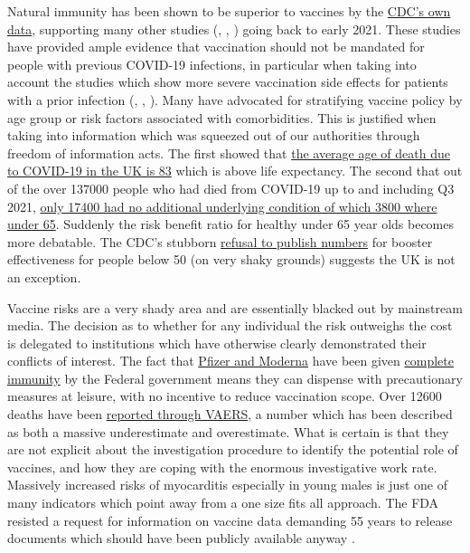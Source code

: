\documentclass[11pt,a4paper,notitlepage]{report}
\begin{document}
Natural immunity has been shown to be superior to vaccines by the \href{https://www.cdc.gov/mmwr/volumes/71/wr/mm7104e1.htm#F1_down}{CDC's own data}, supporting many other studies (\cite{Gazit2021.08.24.21262415}, \cite{doi:10.1126/science.abf4063}, \cite{Goldberg2021.04.20.21255670}) going back to early 2021. These studies have provided ample evidence that vaccination should not be mandated for people with previous COVID-19 infections, in particular when taking into account the studies which show more severe vaccination side effects for patients with a prior infection (\cite{Monforte2021}, \cite{LI20221082}, \cite{Raw22}). Many have advocated for stratifying vaccine policy by age group or risk factors associated with comorbidities. This is justified when taking into information which was squeezed out of our authorities through freedom of information acts. The first showed that \href{https://www.ons.gov.uk/aboutus/transparencyandgovernance/freedomofinformationfoi/averageageofthosewhohaddiedwithcovid19}{the average age of death due to COVID-19 in the UK is 83} which is above life expectancy. The second that out of the over 137000 people who had died from COVID-19 up to and including Q3 2021, \href{https://www.ons.gov.uk/aboutus/transparencyandgovernance/freedomofinformationfoi/deathsfromcovid19withnootherunderlyingcauses}{only 17400 had no additional underlying condition of which 3800 where under 65}. Suddenly the risk benefit ratio for healthy under 65 year olds becomes more debatable. The CDC's stubborn \href{https://www.dailymail.co.uk/news/article-10537161/CDC-refusing-publish-data-collected-booster-effectiveness-aged-18-49.html}{refusal to publish numbers} for booster effectiveness for people below 50 (on very shaky grounds) suggests the UK is not an exception. 

Vaccine risks are a very shady area and are essentially blacked out by mainstream media. The decision as to whether for any individual the risk outweighs the cost is delegated to institutions which have otherwise clearly demonstrated their conflicts of interest. The fact that \href{https://www.cnbc.com/2020/12/16/covid-vaccine-side-effects-compensation-lawsuit.html}{Pfizer and Moderna} have been given \href{https://crsreports.congress.gov/product/pdf/LSB/LSB10443}{complete immunity} by the Federal government means they can dispense with precautionary measures at leisure, with no incentive to reduce vaccination scope. Over 12600 deaths have been \href{https://www.cdc.gov/coronavirus/2019-ncov/vaccines/safety/adverse-events.html}{reported through VAERS}, a number which has been described as both a massive underestimate and overestimate. What is certain is that they are not explicit about the investigation procedure to identify the potential role of vaccines, and how they are coping with the enormous investigative work rate. Massively increased risks of myocarditis especially in young males \cite{10.1001/jama.2021.24110} is just one of many indicators which point away from a one size fits all approach. The FDA resisted a request for information on vaccine data demanding 55 years to release documents which should have been publicly available anyway \cite{mailonline19112021}.
\end{document}
